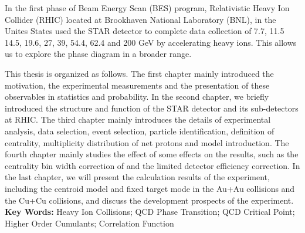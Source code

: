 In the first phase of Beam Energy Scan (BES) program, Relativistic Heavy Ion Collider (RHIC) located at Brookhaven National Laboratory (BNL), in the Unites States used the STAR detector to complete data collection of 7.7, 11.5  14.5, 19.6, 27, 39, 54.4, 62.4 and 200 GeV by accelerating heavy ions. This allows us to explore the phase diagram in a broader range.


 
 This thesis is organized as follows. The first chapter mainly introduced the motivation, the experimental measurements and the presentation of  these observables in statistics and probability. In the second chapter, we briefly introduced the structure and function of the STAR detector and its sub-detectors at RHIC. The third chapter mainly introduces the details of experimental analysis, data selection, event selection, particle identification, definition of centrality,  multiplicity distribution of net protons and model introduction. The fourth chapter mainly studies the effect of some effects on the results, such as the centrality bin width correction of and the limited detector efficiency correction. In the last chapter, we will present the calculation results of the experiment, including the centroid model and fixed target mode in the Au+Au collisions and the Cu+Cu collisions, and discuss the development prospects of the experiment.\\


\textbf{Key Words:} Heavy Ion Collisions; QCD Phase Transition; QCD Critical Point; Higher Order Cumulants; Correlation Function